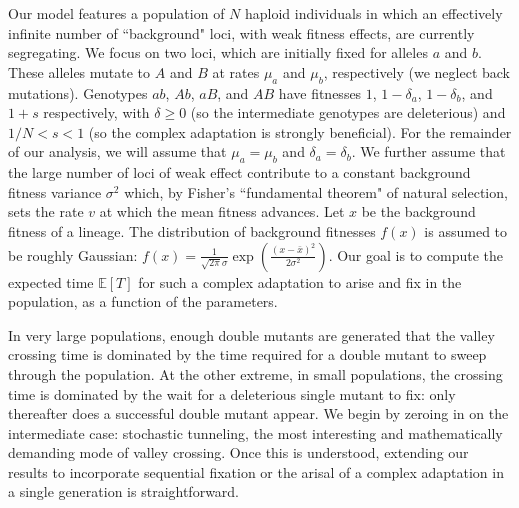 \documentclass[rmp]{revtex4}
\begin{document}
Our model features a population of $N$ haploid individuals in which an effectively infinite number of ``background" loci, with weak fitness effects, are currently segregating.
We focus on two loci, which are initially fixed for alleles $a$ and $b$.
These alleles mutate to $A$ and $B$ at rates $\mu_a$ and $\mu_b$, respectively (we neglect back mutations).
Genotypes $ab$, $Ab$, $aB$, and $AB$ have fitnesses $1$, $1-\delta_a$, $1-\delta_b$, and $1+s$ respectively, with $\delta \geq 0$ (so the intermediate genotypes are deleterious) and $1/N < s < 1$ (so the complex adaptation is strongly beneficial).
For the remainder of our analysis, we will assume that $\mu_a = \mu_b$ and $\delta_a = \delta_b$.
We further assume that the large number of loci of weak effect contribute to a constant background fitness variance $\sigma^2$ which, by Fisher's ``fundamental theorem" of natural selection, sets the rate $v$ at which the mean fitness advances.
Let $x$ be the background fitness of a lineage.
The distribution of background fitnesses $f(x)$ is assumed to be roughly Gaussian: $f(x) = \frac{1}{\sqrt{2\pi}\sigma} \exp (\frac{(x-\bar{x})^2}{2\sigma^2})$.
Our goal is to compute the expected time $\mathbb{E}\left[ T\right]$ for such a complex adaptation to arise and fix in the population, as a function of the parameters.

In very large populations, enough double mutants are generated that the valley crossing time is dominated by the time required for a double mutant to sweep through the population.
At the other extreme, in small populations, the crossing time is dominated by the wait for a deleterious single mutant to fix: only thereafter does a successful double mutant appear.
We begin by zeroing in on the intermediate case: stochastic tunneling, the most interesting and mathematically demanding mode of valley crossing.
Once this is understood, extending our results to incorporate sequential fixation or the arisal of a complex adaptation in a single generation is straightforward.
\end{document}
